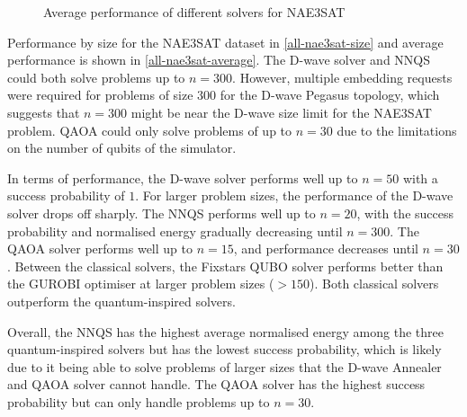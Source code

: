 \begin{figure}[!htbp]
    \centering
    \hfill
    \caption{Average performance of different solvers for NAE3SAT}
    \label{all-nae3sat-average}
\end{figure}

Performance by size for the NAE3SAT dataset in \autoref{all-nae3sat-size} and average performance is shown in \autoref{all-nae3sat-average}. The D-wave solver and NNQS could both solve problems up to $n=300$. However, multiple embedding requests were required for problems of size $300$ for the D-wave Pegasus topology, which suggests that $n=300$ might be near the D-wave size limit for the NAE3SAT problem. QAOA could only solve problems of up to $n=30$ due to the limitations on the number of qubits of the simulator.

In terms of performance, the D-wave solver performs well up to $n=50$ with a success probability of $1$. For larger problem sizes, the performance of the D-wave solver drops off sharply. The NNQS performs well up to $n=20$, with the success probability and normalised energy gradually decreasing until $n=300$. The QAOA solver performs well up to $n=15$, and performance decreases until $n=30$. Between the classical solvers, the Fixstars QUBO solver performs better than the GUROBI optimiser at larger problem sizes ($>150$). Both classical solvers outperform the quantum-inspired solvers.

Overall, the NNQS has the highest average normalised energy among the three quantum-inspired solvers but has the lowest success probability, which is likely due to it being able to solve problems of larger sizes that the D-wave Annealer and QAOA solver cannot handle. The QAOA solver has the highest success probability but can only handle problems up to $n=30$.


